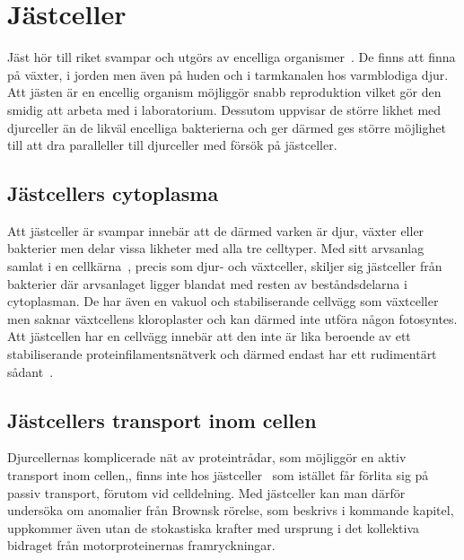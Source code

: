 

\section{Jästceller}

Jäst hör till riket svampar och utgörs av encelliga organismer~\cite{SGD_yeast}.
De finns att finna på växter, i jorden men även på huden och i tarmkanalen hos varmblodiga djur. 
Att jästen är en encellig organism möjliggör snabb reproduktion vilket gör den smidig att arbeta med i laboratorium. Dessutom uppvisar de större likhet med djurceller än de likväl encelliga bakterierna och ger därmed ges större möjlighet till att dra paralleller till djurceller med försök på jästceller. 

\subsection{Jästcellers cytoplasma}
Att jästceller är svampar innebär att de därmed varken är djur, växter eller bakterier men delar vissa likheter med alla tre celltyper. Med sitt arvsanlag samlat i en cellkärna~\cite{SGD_yeast}, precis som djur- och växtceller, skiljer sig jästceller från bakterier där arvsanlaget ligger blandat med resten av beståndsdelarna i cytoplasman.
De har även en vakuol och stabiliserande cellvägg som växtceller men saknar växtcellens kloroplaster och kan därmed inte utföra någon fotosyntes. Att jästcellen har en cellvägg innebär att den inte är lika beroende av ett stabiliserande proteinfilamentsnätverk och därmed endast har ett rudimentärt sådant~\cite{Midtveldt_etal2016}.

\subsection{Jästcellers transport inom cellen}
Djurcellernas komplicerade nät av proteintrådar, som möjliggör en aktiv transport inom cellen,, finns inte hos jästceller~\cite{Midtveldt_etal2016} som istället får förlita sig på passiv transport, förutom vid celldelning. 
Med jästceller kan man därför undersöka om anomalier från Brownsk rörelse, som beskrivs i kommande kapitel, uppkommer även utan de stokastiska krafter med ursprung i det kollektiva bidraget från motorproteinernas framryckningar.




